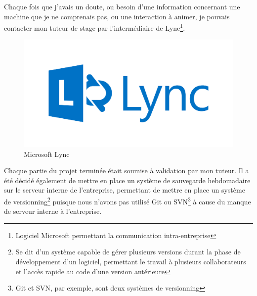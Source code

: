 \documentclass[a4paper]{article}
\begin{document}
    Chaque fois que j'avais un doute, ou besoin d'une information concernant une machine que je ne comprenais pas, ou une interaction à animer, je pouvais contacter mon tuteur de stage par l'intermédiaire de Lync\footnote{Logiciel Microsoft permettant la communication intra-entreprise}. \\

    \begin{figure}[H]
        \centering
        \includegraphics[scale=0.5]{img/logo-lync}
        \caption{Microsoft Lync}
    \end{figure}

    Chaque partie du projet terminée était soumise à validation par mon tuteur. Il a été décidé également de mettre en place un système de sauvegarde hebdomadaire sur le serveur interne de l'entreprise, permettant de mettre en place un système de versionning\footnote{Se dit d'un système capable de gérer plusieurs versions durant la phase de développement d'un logiciel, permettant le travail à plusieurs collaborateurs et l'accès rapide au code d'une version antérieure} puisque nous n'avons pas utilisé Git ou SVN\footnote{Git et SVN, par exemple, sont deux systèmes de versionning} à cause du manque de serveur interne à l'entreprise. \\
\end{document}
